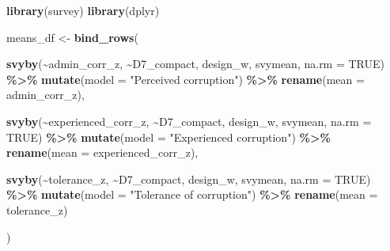\documentclass[
]{article}
\newenvironment{Shaded}{\begin{snugshade}}{\end{snugshade}}
\newcommand{\AttributeTok}[1]{\textcolor[rgb]{0.13,0.29,0.53}{#1}}
\newcommand{\ConstantTok}[1]{\textcolor[rgb]{0.56,0.35,0.01}{#1}}
\newcommand{\FunctionTok}[1]{\textcolor[rgb]{0.13,0.29,0.53}{\textbf{#1}}}
\newcommand{\NormalTok}[1]{#1}
\newcommand{\OtherTok}[1]{\textcolor[rgb]{0.56,0.35,0.01}{#1}}
\newcommand{\SpecialCharTok}[1]{\textcolor[rgb]{0.81,0.36,0.00}{\textbf{#1}}}
\newcommand{\StringTok}[1]{\textcolor[rgb]{0.31,0.60,0.02}{#1}}
\begin{document}
\begin{Shaded}
\begin{Highlighting}[]
\FunctionTok{library}\NormalTok{(survey)}
\FunctionTok{library}\NormalTok{(dplyr)}

\NormalTok{means\_df }\OtherTok{\textless{}{-}} \FunctionTok{bind\_rows}\NormalTok{(}

  \FunctionTok{svyby}\NormalTok{(}\SpecialCharTok{\textasciitilde{}}\NormalTok{admin\_corr\_z, }\SpecialCharTok{\textasciitilde{}}\NormalTok{D7\_compact, design\_w, svymean, }\AttributeTok{na.rm =} \ConstantTok{TRUE}\NormalTok{) }\SpecialCharTok{\%\textgreater{}\%}
    \FunctionTok{mutate}\NormalTok{(}\AttributeTok{model =} \StringTok{"Perceived corruption"}\NormalTok{) }\SpecialCharTok{\%\textgreater{}\%}
    \FunctionTok{rename}\NormalTok{(}\AttributeTok{mean =}\NormalTok{ admin\_corr\_z),}

  \FunctionTok{svyby}\NormalTok{(}\SpecialCharTok{\textasciitilde{}}\NormalTok{experienced\_corr\_z, }\SpecialCharTok{\textasciitilde{}}\NormalTok{D7\_compact, design\_w, svymean, }\AttributeTok{na.rm =} \ConstantTok{TRUE}\NormalTok{) }\SpecialCharTok{\%\textgreater{}\%}
    \FunctionTok{mutate}\NormalTok{(}\AttributeTok{model =} \StringTok{"Experienced corruption"}\NormalTok{) }\SpecialCharTok{\%\textgreater{}\%}
    \FunctionTok{rename}\NormalTok{(}\AttributeTok{mean =}\NormalTok{ experienced\_corr\_z),}

  \FunctionTok{svyby}\NormalTok{(}\SpecialCharTok{\textasciitilde{}}\NormalTok{tolerance\_z, }\SpecialCharTok{\textasciitilde{}}\NormalTok{D7\_compact, design\_w, svymean, }\AttributeTok{na.rm =} \ConstantTok{TRUE}\NormalTok{) }\SpecialCharTok{\%\textgreater{}\%}
    \FunctionTok{mutate}\NormalTok{(}\AttributeTok{model =} \StringTok{"Tolerance of corruption"}\NormalTok{) }\SpecialCharTok{\%\textgreater{}\%}
    \FunctionTok{rename}\NormalTok{(}\AttributeTok{mean =}\NormalTok{ tolerance\_z)}

\NormalTok{)}
\end{Highlighting}
\end{Shaded}
\end{document}
